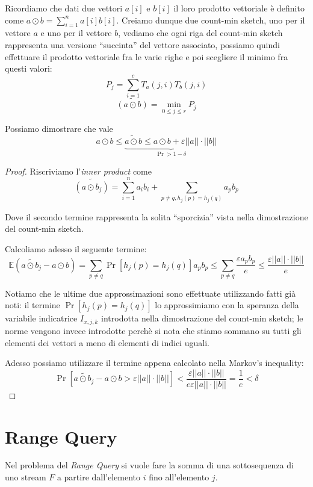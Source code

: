 \documentclass[a4paper,11pt]{book}
\begin{document}
Ricordiamo che dati due vettori $a[i]$ e $b[i]$ il loro prodotto vettoriale \`e definito come $a \odot b = \sum_{i = 1}^{n} a[i]b[i]$. Creiamo dunque due count-min sketch, uno per il vettore $a$ e uno per il vettore $b$, vediamo che ogni riga del count-min sketch rappresenta una versione ``succinta'' del vettore associato, possiamo quindi effettuare il prodotto vettoriale fra le varie righe e poi scegliere il minimo fra questi valori:
$$ P_j = \sum_{i=1}^{c} T_a(j, i) T_b(j, i) $$
$$ \widetilde{(a \odot b)} = \min_{0 \leq j \leq r} P_j$$

Possiamo dimostrare che vale
$$ a \odot b \leq \underbrace{\widetilde{a \odot b} \leq a \odot b + \varepsilon||a||\cdot||b||}_{\Pr > 1 - \delta}$$
\begin{proof}

Riscriviamo l'\emph{inner product} come $$ \widetilde{(a \odot b_j)} = \sum_{i=1}^{n}a_ib_i + \sum_{p \neq q, h_j(p) = h_j(q)}a_pb_p$$

Dove il secondo termine rappresenta la solita ``sporcizia'' vista nella dimostrazione del count-min sketch.

Calcoliamo adesso il seguente termine:$$\mathbb{E}(\widetilde{a \odot b_j} - a \odot b) = \sum_{p \neq q}\Pr[h_j(p) = h_j(q)]a_pb_p \leq \sum_{p \neq q} \frac{\varepsilon a_pb_p}{e} \leq \frac{\varepsilon ||a||\cdot ||b||}{e}$$

Notiamo che le ultime due approssimazioni sono effettuate utilizzando fatti gi\`a noti: il termine $ \Pr[h_j(p) = h_j(q)]$ lo approssimiamo con la speranza della variabile indicatrice $I_{x,j,k}$ introdotta nella dimostrazione del count-min sketch; le norme vengono invece introdotte perch\`e si nota che stiamo sommano su tutti gli elementi dei vettori a meno di elementi di indici uguali.

Adesso possiamo utilizzare il termine appena calcolato nella Markov's inequality: $$\Pr[\widetilde{a \odot b_j} - a \odot b > \varepsilon ||a|| \cdot ||b||] < \frac{\varepsilon ||a||\cdot ||b||}{e \varepsilon ||a||\cdot ||b||} = \frac{1}{e} < \delta$$

\end{proof}

\section{Range Query}

Nel problema del \emph{Range Query} si vuole fare la somma di una sottosequenza di uno stream $F$ a partire dall'elemento $i$ fino all'elemento $j$.
\end{document}

